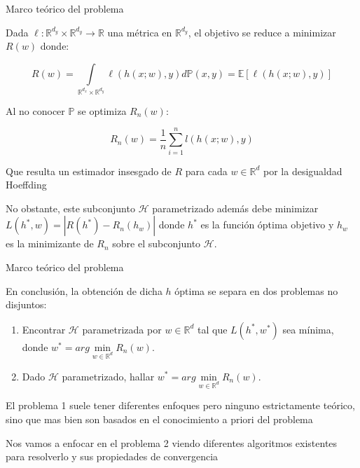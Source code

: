 \documentclass{beamer}
\newcommand{\R}{{\mathbb{R}}}
\newcommand{\abs}[1]{\left\lvert#1\right\rvert}
\begin{document}
\begin{frame}{Marco te\'orico del problema}

Dada $ \ell : \mathbb{R}^{d_y} \times \mathbb{R}^{d_y} \rightarrow \mathbb{R}$ una m\'etrica en $\R^{d_y}$,  el objetivo se reduce a minimizar $R(w)$ donde:

\begin{equation*}
	R(w) = \int\limits_{\mathbb{R}^{d_x}\times \mathbb{R}^{d_y}} {\ell \left(h(x;w), y\right) d\mathbb{P}(x,y)} = \mathbb{E} \left[ \ell \left( h(x;w), y \right) \right]
\end{equation*}

\pause

Al no conocer $\mathbb{P}$ se optimiza $R_n(w)$:

\begin{equation*}
R_n(w) = \frac{1}{n} \sum\limits_{i=1}^{n} {l \left( h(x;w), y\right)}
\end{equation*}

Que resulta un estimador insesgado de $R$ para cada $w \in \R^d$ por la desigualdad Hoeffding \nocite{hoeffding:1962} 

\pause

No obstante, este subconjunto $\mathcal{H}$ parametrizado adem\'as debe minimizar $L(h^*, w) = \abs{R(h^*) - R_n(h_w)}$ donde $h^*$ es la funci\'on \'optima objetivo y $h_w$ es la minimizante de $R_n$ sobre el subconjunto $\mathcal{H}$.

\end{frame}

\begin{frame}{Marco te\'orico del problema}

En conclusi\'on, la obtenci\'on de dicha $h$ \'optima se separa en dos problemas no disjuntos:

\begin{enumerate}
	\item Encontrar $\mathcal{H}$ parametrizada por $w\in \R^d$ tal que $L(h^*, w^*)$ sea m\'inima, donde $w^* = arg\min\limits_{w \in \R^d}{R_n(w)}$.
	\item Dado $\mathcal{H}$ parametrizado, hallar $w^* = arg\min\limits_{w \in \R^d}{R_n(w)}$.
\end{enumerate}

\pause

El problema 1  suele tener diferentes enfoques pero ninguno estrictamente te\'orico, sino que mas bien son basados en el conocimiento a priori del problema

Nos vamos a enfocar en el problema 2 viendo diferentes algoritmos existentes para resolverlo y sus propiedades de convergencia

\end{frame}
\end{document}
